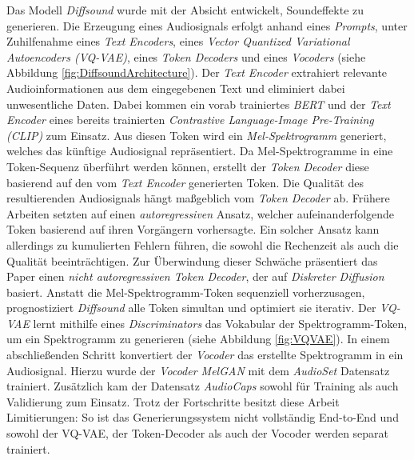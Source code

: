 \documentclass[
  a4paper,  %
  twoside,  %
  bibliography=totoc,
  headsepline,
  cleardoublepage=empty,
  parskip=half,
  draft=false
]{scrbook}
\begin{document}
Das Modell \emph{Diffsound} \cite{yang_diffsound_2023} wurde mit der Absicht entwickelt, Soundeffekte zu generieren. Die Erzeugung eines Audiosignals erfolgt anhand eines \emph{Prompts}, unter Zuhilfenahme eines \emph{Text Encoders}, eines \emph{Vector Quantized Variational Autoencoders (VQ-VAE)}, eines \emph{Token Decoders} und eines \emph{Vocoders} (siehe Abbildung \ref{fig:DiffsoundArchitecture}). Der \emph{Text Encoder} extrahiert relevante Audioinformationen aus dem eingegebenen Text und eliminiert dabei unwesentliche Daten. Dabei kommen ein vorab trainiertes \emph{BERT} \cite{devlin_bert_2019} und der \emph{Text Encoder} eines bereits trainierten \emph{Contrastive Language-Image Pre-Training (CLIP)} \cite{radford_learning_2021} zum Einsatz. Aus diesen Token wird ein \emph{Mel-Spektrogramm} generiert, welches das künftige Audiosignal repräsentiert. Da Mel-Spektrogramme in eine Token-Sequenz überführt werden können, erstellt der \emph{Token Decoder} diese basierend auf den vom \emph{Text Encoder} generierten Token. Die Qualität des resultierenden Audiosignals hängt maßgeblich vom \emph{Token Decoder} ab. Frühere Arbeiten \cite{liu_conditional_2021, iashin_taming_2021} setzten auf einen \emph{autoregressiven} Ansatz, welcher aufeinanderfolgende Token basierend auf ihren Vorgängern vorhersagte. Ein solcher Ansatz kann allerdings zu kumulierten Fehlern führen, die sowohl die Rechenzeit als auch die Qualität beeinträchtigen. Zur Überwindung dieser Schwäche präsentiert das Paper einen \emph{nicht autoregressiven Token Decoder}, der auf \emph{Diskreter Diffusion} \cite{sohl-dickstein_deep_2015, austin_structured_2023} basiert. Anstatt die Mel-Spektrogramm-Token sequenziell vorherzusagen, prognostiziert \emph{Diffsound} alle Token simultan und optimiert sie iterativ. Der \emph{VQ-VAE} \cite{oord_neural_2018} lernt mithilfe eines \emph{Discriminators} das Vokabular der Spektrogramm-Token, um ein Spektrogramm zu generieren (siehe Abbildung \ref{fig:VQVAE}). In einem abschließenden Schritt konvertiert der \emph{Vocoder} das erstellte Spektrogramm in ein Audiosignal. Hierzu wurde der \emph{Vocoder MelGAN} \cite{kumar_melgan_2019} mit dem \emph{AudioSet} \cite{gemmeke_audio_2017} Datensatz trainiert. Zusätzlich kam der Datensatz \emph{AudioCaps} \cite{kim_audiocaps_2019} sowohl für Training als auch Validierung zum Einsatz. Trotz der Fortschritte besitzt diese Arbeit Limitierungen: So ist das Generierungssystem nicht vollständig End-to-End und sowohl der VQ-VAE, der Token-Decoder als auch der Vocoder werden separat trainiert. \cite{yang_diffsound_2023}
\end{document}
